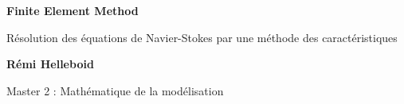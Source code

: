 \begin{titlepage}
	\begin{center}
		\begin{huge}
		\vspace*{2cm}
		\textbf{Finite Element Method}

		\vspace{1cm}
		Résolution des équations de Navier-Stokes par une méthode des caractéristiques
		\end{huge}
		
		\vspace*{2.5cm}
		
		
		\textbf{Rémi Helleboid}
		
		\vfill
		
		Master 2 : Mathématique de la modélisation \\
				
		\vspace*{2.5cm}

	
	\end{center}
\end{titlepage}